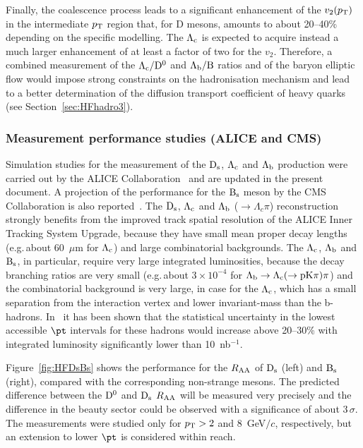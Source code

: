 Finally, the coalescence process leads to a significant enhancement of the $v_2(p\sb{\scriptstyle\mathrm{T}})$ in the
intermediate $p\sb{\scriptstyle\mathrm{T}}$ region that, for D mesons, amounts to about 20--40\% depending on the
specific modelling. The $\rm \Lambda_c$ is expected to acquire instead a much 
larger enhancement of at least a factor of two for the $v_2$. Therefore, a combined measurement of the
$\rm \Lambda_c/D^0$ and $\rm \Lambda_b/B$ ratios and of the baryon elliptic flow would impose strong constraints
on the hadronisation mechanism and lead to a better determination of the diffusion transport coefficient of heavy quarks (see Section~\ref{sec:HFhadro3}).

\subsubsection{Measurement performance studies (ALICE and CMS)}
\label{sec:HFhadro2}


Simulation studies for the measurement of the $\rm D_s$, $\rm \Lambda_c$ and $\rm \Lambda_b$
production were carried out by the ALICE Collaboration~\cite{Abelev:1625842} and are updated in the present document. A projection of the performance for the $\rm B_s$ meson by the CMS Collaboration is also reported~\cite{CMS-PAS-FTR-17-002}. The $\rm D_s$, $\rm \Lambda_c$ and $\rm \Lambda_b$ ($\to\Lambda_c\pi$) reconstruction strongly benefits from the improved track spatial resolution of the ALICE Inner Tracking System Upgrade, because they have small mean proper decay lengths (e.g.\,about 60~$\mu$m for $\rm \Lambda_c$)
and large combinatorial backgrounds. The $\rm \Lambda_c$, $\rm \Lambda_b$ and $\rm B_s$, in particular, require very large integrated luminosities, because the decay branching ratios are very small (e.g.\,about $3\times 10^{-4}$ for $\rm \Lambda_b\to\Lambda_c(\to pK\pi)\pi$) and the combinatorial background is very large, in case for the $\rm \Lambda_c$, which has a small separation from the interaction vertex and lower invariant-mass than the b-hadrons. In~\cite{CMS-PAS-FTR-17-002} it has been shown that the statistical uncertainty in the lowest accessible $\pt$ intervals for these hadrons would increase above 20--30\% with integrated luminosity significantly lower than 10~nb$^{-1}$.

Figure~\ref{fig:HFDsBs} shows the performance for the $R_{\rm AA}$ of $\rm D_s$ (left) and $\rm B_s$ (right), compared with the corresponding non-strange mesons. The predicted difference between the $\rm D^0$ and $\rm D_s$ $R_{\rm AA}$ will be measured very precisely and the difference in the beauty sector could be observed with a significance of about 3\,$\sigma$.
The measurements were studied only for $p_{\rm T}>2$ and 8~GeV$/c$, respectively, but an extension to lower $\pt$ is considered within reach.

